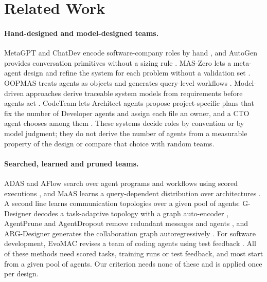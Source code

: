 \section{Related Work}
\label{sec:related}

\paragraph{Hand-designed and model-designed teams.} MetaGPT and ChatDev encode software-company roles by hand \citep{hong2024metagpt,qian2024chatdev}, and AutoGen provides conversation primitives without a sizing rule \citep{wu2023autogen}. MAS-Zero lets a meta-agent design and refine the system for each problem without a validation set \citep{ke2025maszero}. OOPMAS treats agents as objects and generates query-level workflows \citep{cheng2026oopmas}. Model-driven approaches derive traceable system models from requirements before agents act \citep{wei2026modeldriven}. CodeTeam lets Architect agents propose project-specific plans that fix the number of Developer agents and assign each file an owner, and a CTO agent chooses among them \citep{wang2026codeteam}. These systems decide roles by convention or by model judgment; they do not derive the number of agents from a measurable property of the design or compare that choice with random teams.

\paragraph{Searched, learned and pruned teams.} ADAS and AFlow search over agent programs and workflows using scored executions \citep{hu2025adas,zhang2025aflow}, and MaAS learns a query-dependent distribution over architectures \citep{zhang2025maas}. A second line learns communication topologies over a given pool of agents: G-Designer decodes a task-adaptive topology with a graph auto-encoder \citep{zhang2025gdesigner}, AgentPrune and AgentDropout remove redundant messages and agents \citep{zhang2025agentprune,wang2025agentdropout}, and ARG-Designer generates the collaboration graph autoregressively \citep{li2026argdesigner}. For software development, EvoMAC revises a team of coding agents using test feedback \citep{hu2025evomac}. All of these methods need scored tasks, training runs or test feedback, and most start from a given pool of agents. Our criterion needs none of these and is applied once per design.

